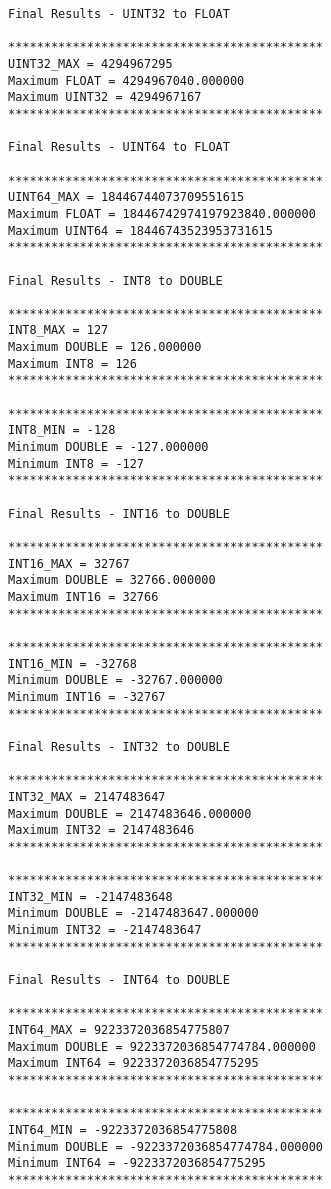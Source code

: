 \begin{verbatim}
Final Results - UINT32 to FLOAT

********************************************
UINT32_MAX = 4294967295
Maximum FLOAT = 4294967040.000000
Maximum UINT32 = 4294967167
********************************************

Final Results - UINT64 to FLOAT

********************************************
UINT64_MAX = 18446744073709551615
Maximum FLOAT = 18446742974197923840.000000
Maximum UINT64 = 18446743523953731615
********************************************

Final Results - INT8 to DOUBLE

********************************************
INT8_MAX = 127
Maximum DOUBLE = 126.000000
Maximum INT8 = 126
********************************************

********************************************
INT8_MIN = -128
Minimum DOUBLE = -127.000000
Minimum INT8 = -127
********************************************

Final Results - INT16 to DOUBLE

********************************************
INT16_MAX = 32767
Maximum DOUBLE = 32766.000000
Maximum INT16 = 32766
********************************************

********************************************
INT16_MIN = -32768
Minimum DOUBLE = -32767.000000
Minimum INT16 = -32767
********************************************

Final Results - INT32 to DOUBLE

********************************************
INT32_MAX = 2147483647
Maximum DOUBLE = 2147483646.000000
Maximum INT32 = 2147483646
********************************************

********************************************
INT32_MIN = -2147483648
Minimum DOUBLE = -2147483647.000000
Minimum INT32 = -2147483647
********************************************

Final Results - INT64 to DOUBLE

********************************************
INT64_MAX = 9223372036854775807
Maximum DOUBLE = 9223372036854774784.000000
Maximum INT64 = 9223372036854775295
********************************************

********************************************
INT64_MIN = -9223372036854775808
Minimum DOUBLE = -9223372036854774784.000000
Minimum INT64 = -9223372036854775295
********************************************


\end{verbatim}

